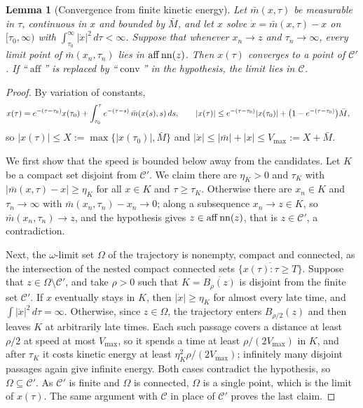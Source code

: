 \documentclass{article} %
\newcommand{\iclrstart}{\begin{aligned}&}\newcommand{\iclrend}{\end{aligned}}
\newcommand{\iclrallow}{\allowbreak}
\newcommand{\iclrstart}{}\newcommand{\iclrend}{}\newcommand{\iclrallow}{}
\theoremstyle{plain}
\newtheorem{lemma}[theorem]{Lemma}
\theoremstyle{definition}
\theoremstyle{remark}
\begin{document}
\begin{lemma}[Convergence from finite kinetic energy]
\label{lem:conv}
Let $\bar m(x,\tau)$ be measurable in $\tau$, continuous in $x$ and bounded by $\bar M$, and let
$x$ solve $\dot x=\bar m(x,\tau)-x$ on $[\tau_0,\infty)$ with $\int_{\tau_0}^\infty|\dot x|^2\,d\tau
<\infty$. Suppose that whenever $x_n\to z$ and $\tau_n\to\infty$, every limit point of
$\bar m(x_n,\tau_n)$ lies in $\operatorname{aff}\operatorname{nn}(z)$. Then $x(\tau)$ converges to a point of
$\mathcal C'$. If ``$\operatorname{aff}$'' is replaced by ``$\operatorname{conv}$'' in the
hypothesis, the limit lies in $\mathcal C$.
\end{lemma}
\begin{proof}
By variation of constants,
\[
\iclrstart x(\tau)=e^{-(\tau-\tau_0)}x(\tau_0)+\int_{\tau_0}^\tau e^{-(\tau-s)}\,\bar m(x(s),s)\,ds,
\iclrqbr
|x(\tau)|\le e^{-(\tau-\tau_0)}|x(\tau_0)|+\bigl(1-e^{-(\tau-\tau_0)}\bigr)\bar M,\iclrend
\]
so $|x(\tau)|\le X:=\max\{|x(\tau_0)|,\bar M\}$ and $|\dot x|\le|\bar m|+|x|\le V_{\max}:=X+\bar M$.

We first show that the speed is bounded below away from the candidates. Let $K$ be a compact set
disjoint from $\mathcal C'$. We claim there are $\eta_K>0$ and $\tau_K$ with
$|\bar m(x,\tau)-x|\ge\eta_K$ for all $x\in K$ and $\tau\ge\tau_K$. Otherwise there are $x_n\in K$
and $\tau_n\to\infty$ with $\bar m(x_n,\tau_n)-x_n\to0$; along a subsequence $x_n\to z\in K$, so
$\bar m(x_n,\tau_n)\to z$, and the hypothesis gives $z\in\operatorname{aff}\operatorname{nn}(z)$, that is
$z\in\mathcal C'$, a contradiction.

Next, the $\omega$-limit set $\Omega$ of the trajectory is nonempty, compact and connected, as
the intersection of the nested compact connected sets $\overline{\{x(\tau):\tau\ge T\}}$. Suppose
that $z\in\Omega\setminus\mathcal C'$, and take $\rho>0$ such that $K=\overline{B_\rho(z)}$ is
disjoint from the finite set $\mathcal C'$. If $x$ eventually stays in $K$, then $|\dot x|\ge\eta_K$
for almost every late time, and $\int|\dot x|^2\,d\tau=\infty$. Otherwise, since $z\in\Omega$, the
trajectory enters $B_{\rho/2}(z)$ and then leaves $K$ at arbitrarily late times. Each such passage
covers a distance at least $\rho/2$ at speed at most $V_{\max}$, so it spends a time at least
$\rho/(2V_{\max})$ in $K$, and after $\tau_K$ it costs kinetic energy at least
$\eta_K^2\rho/(2V_{\max})$; infinitely many disjoint passages again give infinite energy. Both cases
contradict the hypothesis, so $\Omega\subseteq\mathcal C'$. As $\mathcal C'$ is finite and $\Omega$
is connected, $\Omega$ is a single point, which is the limit of $x(\tau)$. The same argument with
$\mathcal C$ in place of $\mathcal C'$ proves the last claim.
\end{proof}
\end{document}
